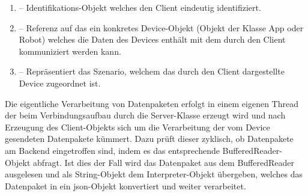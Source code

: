 \begin{enumerate}
	\item{} -- Identifikations-Objekt welches den Client eindeutig identifiziert.
	\item{} -- Referenz auf das ein konkretes Device-Objekt (Objekt der Klasse App oder Robot) welches die 
	Daten des Devices enthält mit dem durch den Client kommuniziert werden kann.
	\item{} -- Repräsentiert das Szenario, welchem das durch den Client dargestellte Device zugeordnet ist. 
\end{enumerate}
Die eigentliche Verarbeitung von Datenpaketen erfolgt in einem eigenen Thread der beim Verbindungsaufbau durch die Server-Klasse erzeugt wird und nach
Erzeugung des Client-Objekts sich um die Verarbeitung der vom Device gesendeten Datenpakete kümmert. Dazu prüft dieser zyklisch, ob
Datenpakete am Backend eingetroffen sind, indem es das entsprechende BufferedReader-Objekt abfragt. Ist dies der Fall
wird das Datenpaket aus dem BufferedReader ausgelesen und als String-Objekt dem Interpreter-Objekt übergeben, welches
das Datenpaket in ein \gls{json}-Objekt konvertiert und weiter verarbeitet.
